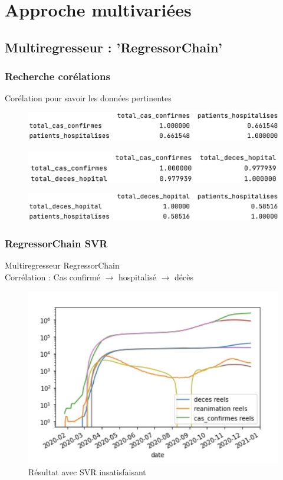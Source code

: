 \documentclass{beamer}
\begin{document}
\section{Approche multivariées}
\subsection{Multiregresseur : 'RegressorChain'}
\begin{frame}
	\frametitle{Recherche corélations}
	Corélation pour savoir les données pertinentes
	\begin{figure}
		\includegraphics[width=\textwidth]{cor2}
	\end{figure}
	\begin{figure}
		\includegraphics[width=\textwidth]{cor1}
	\end{figure}
	\begin{figure}
		\includegraphics[width=\textwidth]{cor4}
	\end{figure}
\end{frame}

\begin{frame}%
	\frametitle{RegressorChain SVR}
	Multiregresseur RegressorChain\\ Corrélation : Cas confirmé $\rightarrow$ hospitalisé $\rightarrow$ décès 
	
	\begin{figure}[h]
		\includegraphics[scale=0.43]{mulitregr_epic_fail}
		\caption{Résultat avec SVR insatisfaisant}
	\end{figure}
\end{frame}
\end{document}
